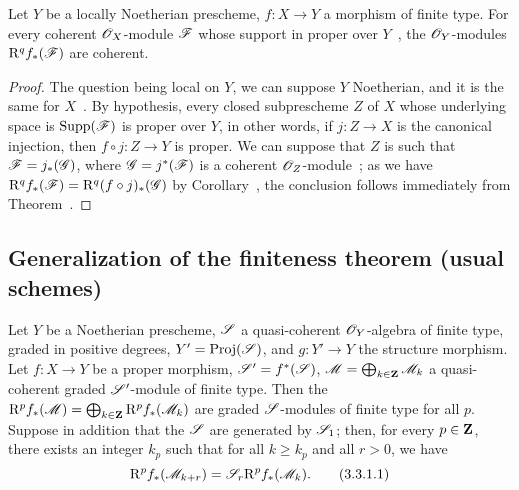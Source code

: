\begin{corollary}[3.2.4]
\label{III.3.2.4}
Let $Y$ be a locally Noetherian prescheme, $f:X\to Y$ a morphism of finite type.
For every coherent $\mathscr{O}_X$-module $\mathscr{F}$ whose support in proper over $Y$~, the $\mathscr{O}_Y$-modules $\mathrm{R}^q f_*(\mathscr{F})$ are coherent.
\end{corollary}

\begin{proof}
The question being local on $Y$, we can suppose $Y$ Noetherian, and it is the same for $X$~.
By hypothesis, every closed subprescheme $Z$ of $X$ whose underlying space is $\operatorname{Supp}(\mathscr{F})$ is proper over $Y$, in other words, if $j:Z\to X$ is the canonical injection, then $f\circ j:Z\to Y$ is proper.
We can suppose that $Z$ is such that $\mathscr{F}=j_*(\mathscr{G})$, where $\mathscr{G}=j^*(\mathscr{F})$ is a coherent $\mathscr{O}_Z$-module~; as we have $\mathrm{R}^q f_*(\mathscr{F})=\mathrm{R}^q(f\circ j)_*(\mathscr{G})$ by Corollary~, the conclusion follows immediately from Theorem~.
\end{proof}

\subsection{Generalization of the finiteness theorem (usual schemes)}
\label{subsection:III.3.3}

\begin{proposition}[3.3.1]
\label{III.3.3.1}
Let $Y$ be a Noetherian prescheme, $\mathscr{S}$ a quasi-coherent $\mathscr{O}_Y$-algebra of finite type, graded in positive degrees, $Y'=\operatorname{Proj}(\mathscr{S})$, and $g:Y'\to Y$ the structure morphism.
Let $f:X\to Y$ be a proper morphism, $\mathscr{S}'=f^*(\mathscr{S})$, $\mathscr{M}=\bigoplus_{k\in\mathbf{Z}}\mathscr{M}_k$ a quasi-coherent graded $\mathscr{S}'$-module of finite type.
Then the $\mathrm{R}^p f_*(\mathscr{M})=\bigoplus_{k\in\mathbf{Z}}\mathrm{R}^p f_*(\mathscr{M}_k)$ are graded $\mathscr{S}$-modules of finite type for all $p$.
Suppose in addition that the $\mathscr{S}$ are generated by $\mathscr{S}_1$; then, for every $p\in\mathbf{Z}$, there exists an integer $k_p$ such that for all $k\geq k_p$ and all $r>0$, we have
\[
\label{III.3.3.1.1}
  \mathrm{R}^p f_*(\mathscr{M}_{k+r})=\mathscr{S}_r\mathrm{R}^p f_*(\mathscr{M}_k).
  \tag{3.3.1.1}
\] 
\end{proposition}

